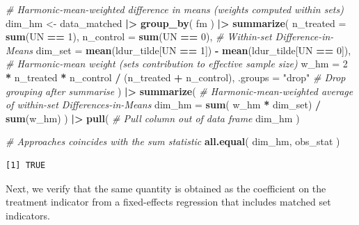 \documentclass[
  12pt,
  leqno]{article}
\newenvironment{Shaded}{\begin{snugshade}}{\end{snugshade}}
\newcommand{\AttributeTok}[1]{\textcolor[rgb]{0.13,0.29,0.53}{#1}}
\newcommand{\CommentTok}[1]{\textcolor[rgb]{0.56,0.35,0.01}{\textit{#1}}}
\newcommand{\DecValTok}[1]{\textcolor[rgb]{0.00,0.00,0.81}{#1}}
\newcommand{\FunctionTok}[1]{\textcolor[rgb]{0.13,0.29,0.53}{\textbf{#1}}}
\newcommand{\NormalTok}[1]{#1}
\newcommand{\OtherTok}[1]{\textcolor[rgb]{0.56,0.35,0.01}{#1}}
\newcommand{\SpecialCharTok}[1]{\textcolor[rgb]{0.81,0.36,0.00}{\textbf{#1}}}
\newcommand{\StringTok}[1]{\textcolor[rgb]{0.31,0.60,0.02}{#1}}
\begin{document}
\singlespacing

\begin{Shaded}
\begin{Highlighting}[]
\CommentTok{\# Harmonic{-}mean{-}weighted difference in means (weights computed within sets)}
\NormalTok{dim\_hm }\OtherTok{\textless{}{-}}\NormalTok{ data\_matched }\SpecialCharTok{|\textgreater{}}
  \FunctionTok{group\_by}\NormalTok{(}
\NormalTok{    fm}
\NormalTok{  ) }\SpecialCharTok{|\textgreater{}}
  \FunctionTok{summarize}\NormalTok{(}
    \AttributeTok{n\_treated =} \FunctionTok{sum}\NormalTok{(UN }\SpecialCharTok{==} \DecValTok{1}\NormalTok{),}
    \AttributeTok{n\_control =} \FunctionTok{sum}\NormalTok{(UN }\SpecialCharTok{==} \DecValTok{0}\NormalTok{),}
    \CommentTok{\# Within{-}set Difference{-}in{-}Means}
    \AttributeTok{dim\_set   =} \FunctionTok{mean}\NormalTok{(ldur\_tilde[UN }\SpecialCharTok{==} \DecValTok{1}\NormalTok{]) }\SpecialCharTok{{-}} \FunctionTok{mean}\NormalTok{(ldur\_tilde[UN }\SpecialCharTok{==} \DecValTok{0}\NormalTok{]),}
    \CommentTok{\# Harmonic{-}mean weight (set\textquotesingle{}s contribution to effective sample size)}
    \AttributeTok{w\_hm      =} \DecValTok{2} \SpecialCharTok{*}\NormalTok{ n\_treated }\SpecialCharTok{*}\NormalTok{ n\_control }\SpecialCharTok{/}\NormalTok{ (n\_treated }\SpecialCharTok{+}\NormalTok{ n\_control),}
    \AttributeTok{.groups   =} \StringTok{"drop"} \CommentTok{\# Drop grouping after summarise}
\NormalTok{  ) }\SpecialCharTok{|\textgreater{}}
  \FunctionTok{summarize}\NormalTok{(}
    \CommentTok{\# Harmonic{-}mean{-}weighted average of within{-}set Differences{-}in{-}Means}
    \AttributeTok{dim\_hm =} \FunctionTok{sum}\NormalTok{(}
\NormalTok{      w\_hm }\SpecialCharTok{*}\NormalTok{ dim\_set) }\SpecialCharTok{/} \FunctionTok{sum}\NormalTok{(w\_hm)}
\NormalTok{  ) }\SpecialCharTok{|\textgreater{}}
  \FunctionTok{pull}\NormalTok{( }\CommentTok{\# Pull column out of data frame}
\NormalTok{    dim\_hm}
\NormalTok{  )}

\CommentTok{\# Approaches coincides with the sum statistic}
\FunctionTok{all.equal}\NormalTok{(}
\NormalTok{  dim\_hm, obs\_stat}
\NormalTok{)}
\end{Highlighting}
\end{Shaded}

\begin{verbatim}
[1] TRUE
\end{verbatim}

\doublespacing

Next, we verify that the same quantity is obtained as the coefficient on
the treatment indicator from a fixed-effects regression that includes
matched set indicators.
\end{document}
